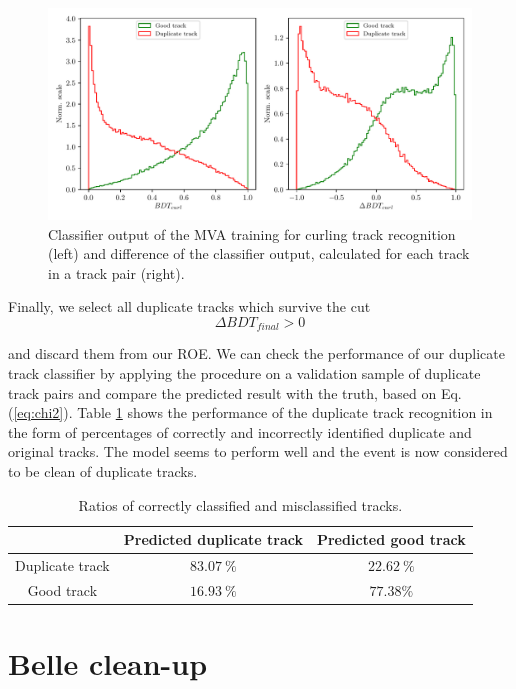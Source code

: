 \begin{figure}[H]
\centering
\captionsetup{width=0.8\linewidth}
\includegraphics[width=\linewidth]{fig/ROECleanup_curl}
\caption{Classifier output of the MVA training for curling track recognition (left) and difference of the classifier output, calculated for each track in a track pair (right).}
\label{fig:ROE_curl}
\end{figure}

Finally, we select all duplicate tracks which survive the cut 
\begin{equation}
\Delta BDT_{final} > 0
\end{equation}

and discard them from our ROE. We can check the performance of our duplicate track classifier by applying the procedure on a validation sample of duplicate track pairs and compare the predicted result with the truth, based on Eq. (\ref{eq:chi2}). Table \ref{tab:rat} shows the performance of the duplicate track recognition in the form of percentages of correctly and incorrectly identified duplicate and original tracks. The model seems to perform well and the event is now considered to be clean of duplicate tracks.

\begin{table}[H]
\centering
\begin{tabular}{|c|c|c|}
\hline
 & Predicted duplicate track & Predicted good track \\
 \hline 
 Duplicate track & $83.07~\%$  & $22.62~\%$  \\
 \hline
 Good track & $16.93~\%$ & $77.38\%$ \\
 \hline
\end{tabular}
\caption{Ratios of correctly classified and misclassified tracks.}
\label{tab:rat}
\end{table}

\section{Belle clean-up}


